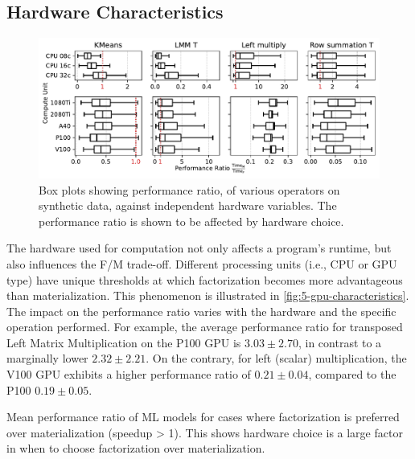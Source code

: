 \subsection{Hardware Characteristics}
\begin{figure}[ht]
  \centering
  \includegraphics[width=\linewidth]{chapters/05_cost_estimation/figures/motivation_speedup_per_operator_per_gpu.pdf}
  \caption[Box plots showing performance ratio against hardware]{Box plots showing performance ratio, of various operators on synthetic data, against independent hardware variables. The performance ratio is shown to be affected by hardware choice.}
  \label{fig:5-gpu-characteristics}
\end{figure}
The hardware used for computation not only affects a program's runtime, but also influences the F/M trade-off. Different processing units (i.e., CPU or GPU type) have unique thresholds at which factorization becomes more advantageous than materialization. This phenomenon is illustrated in \autoref{fig:5-gpu-characteristics}. The impact on the performance ratio varies with the hardware and the specific operation performed. For example, the average performance ratio for transposed Left Matrix Multiplication on the P100 GPU is $3.03\pm2.70$, in contrast to a marginally lower $2.32\pm2.21$. On the contrary, for left (scalar) multiplication, the V100 GPU exhibits a higher performance ratio of $0.21\pm0.04$, compared to the P100 $0.19\pm0.05$.

\begin{table}[ht]
  \centering
  
  \caption[Performance ratio of ML models for cases where factorization has positive impact.]{Mean performance ratio of ML models for cases where factorization is preferred over materialization (speedup > 1). This shows hardware choice is a large factor in when to choose factorization over materialization.}
  \label{tab:5-speedup-per-gpu}
\end{table}

